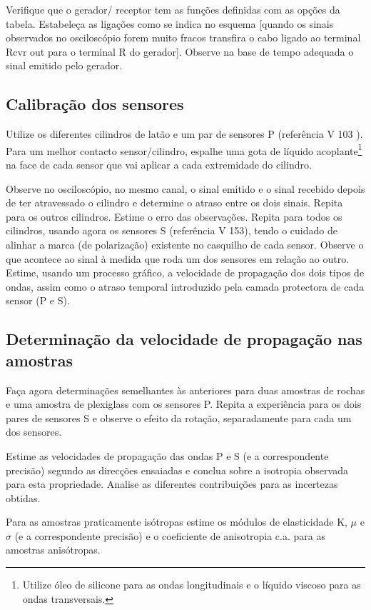 \documentclass[a4paper,12pt]{article}
\begin{document}
Verifique que o gerador/ receptor tem as funções definidas com as opções da tabela. Estabeleça as ligações como se indica no esquema [quando os sinais observados no osciloscópio forem muito fracos transfira o cabo ligado ao terminal Rcvr out para o terminal R do gerador]. Observe na base de tempo adequada o sinal emitido pelo gerador.

\subsection{\sf Calibração dos sensores}
Utilize os diferentes cilindros de latão e um par de sensores P (referência V 103 ). Para um melhor contacto sensor/cilindro, espalhe uma gota de líquido acoplante\footnote{Utilize óleo de silicone para as ondas longitudinais e o líquido viscoso para as ondas transversais.} na face de cada sensor que vai aplicar a cada extremidade do cilindro.

Observe no osciloscópio, no mesmo canal, o sinal emitido e o sinal recebido depois de ter atravessado o cilindro e determine o atraso entre os dois sinais. Repita para os outros cilindros. Estime o erro das observações.
Repita para todos os cilindros, usando agora os sensores S (referência V 153), tendo o cuidado de alinhar a marca (de polarização) existente no casquilho de cada sensor. Observe o que acontece ao sinal à medida que roda um dos sensores em relação ao outro.
Estime, usando um processo gráfico, a velocidade de propagação dos dois tipos de ondas, assim como o atraso temporal introduzido pela camada protectora de cada sensor (P e S).

\subsection{\sf Determinação da velocidade de propagação nas amostras}
Faça agora determinações semelhantes às anteriores para duas amostras de rochas e uma amostra de plexiglass com os sensores P. Repita a experiência para os dois pares de sensores S e observe o efeito da rotação, separadamente para cada um dos sensores.

Estime as velocidades de propagação das ondas P e S (e a correspondente precisão) segundo as direcções ensaiadas e conclua sobre a isotropia observada para esta propriedade. Analise as diferentes contribuições para as incertezas obtidas.

Para as amostras praticamente isótropas estime os módulos de elasticidade K, $\mu$ e $\sigma$ (e a correspondente precisão) e o coeficiente de anisotropia c.a. para as amostras anisótropas.
\end{document}
